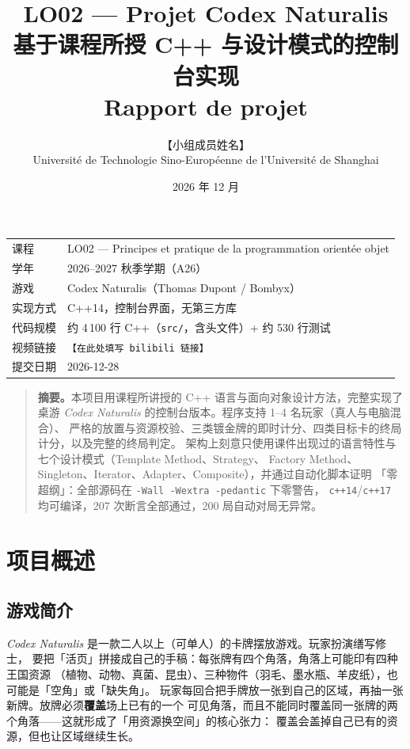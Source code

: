 \documentclass[11pt,a4paper]{ctexart}
\title{\textbf{LO02 --- Projet Codex Naturalis}\\[4pt]
\large 基于课程所授 C++ 与设计模式的控制台实现\\[2pt]
\large Rapport de projet}
\author{【小组成员姓名】\\
Université de Technologie Sino-Européenne de l'Université de Shanghai}
\date{2026 年 12 月}
\newcommand{\cl}[1]{\texttt{#1}}
\begin{document}
\maketitle
\thispagestyle{empty}

\vspace{6mm}
\begin{center}
\begin{tabular}{ll}
\toprule
课程 & LO02 --- Principes et pratique de la programmation orientée objet \\
学年 & 2026--2027 秋季学期（A26）\\
游戏 & Codex Naturalis（Thomas Dupont / Bombyx）\\
实现方式 & C++14，控制台界面，无第三方库 \\
代码规模 & 约 4\,100 行 C++（\cl{src/}，含头文件）+ 约 530 行测试 \\
视频链接 & \cl{【在此处填写 bilibili 链接】} \\
提交日期 & 2026-12-28 \\
\bottomrule
\end{tabular}
\end{center}

\vspace{8mm}
\begin{quote}
\textbf{摘要。}本项目用课程所讲授的 C++ 语言与面向对象设计方法，完整实现了桌游
\emph{Codex Naturalis} 的控制台版本。程序支持 1--4 名玩家（真人与电脑混合）、
严格的放置与资源校验、三类镀金牌的即时计分、四类目标卡的终局计分，以及完整的终局判定。
架构上刻意只使用课件出现过的语言特性与七个设计模式（Template Method、Strategy、
Factory Method、Singleton、Iterator、Adapter、Composite），并通过自动化脚本证明
「零超纲」：全部源码在 \cl{-Wall -Wextra -pedantic} 下零警告，
\cl{c++14}/\cl{c++17} 均可编译，207 次断言全部通过，200 局自动对局无异常。
\end{quote}

\newpage
\tableofcontents
\newpage

\section{项目概述}

\subsection{游戏简介}
\emph{Codex Naturalis} 是一款二人以上（可单人）的卡牌摆放游戏。玩家扮演缮写修士，
要把「活页」拼接成自己的手稿：每张牌有四个角落，角落上可能印有四种王国资源
（植物、动物、真菌、昆虫）、三种物件（羽毛、墨水瓶、羊皮纸），也可能是「空角」或「缺失角」。
玩家每回合把手牌放一张到自己的区域，再抽一张新牌。放牌必须\textbf{覆盖}场上已有的一个
可见角落，而且不能同时覆盖同一张牌的两个角落——这就形成了「用资源换空间」的核心张力：
覆盖会盖掉自己已有的资源，但也让区域继续生长。
\end{document}
